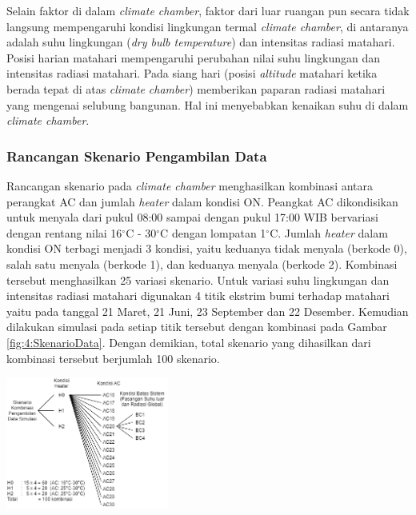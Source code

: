 \documentclass[a4paper,10pt]{article}
\makeatletter
\newenvironment{body}{\begin{multicols}{2}}{\end{multicols}}
\renewenvironment{figure}
{\def\@captype{figure}%
	\captionsetup{labelsep=period,format=hang,font=footnotesize,justification=justified}
}
{}
\makeatother
\begin{document}
\begin{body}
		Selain faktor di dalam \textit{climate chamber}, faktor dari luar ruangan pun secara tidak langsung mempengaruhi kondisi lingkungan termal \textit{climate chamber}, di antaranya adalah suhu lingkungan (\textit{dry bulb temperature}) dan intensitas radiasi matahari. Posisi harian matahari mempengaruhi perubahan nilai suhu lingkungan dan intensitas radiasi matahari. Pada siang hari (posisi \textit{altitude} matahari ketika berada tepat di atas \textit{climate chamber}) memberikan paparan radiasi matahari yang mengenai selubung bangunan. Hal ini menyebabkan kenaikan suhu di dalam \textit{climate chamber}.\\
		
		\subsubsection{Rancangan Skenario Pengambilan Data}
		Rancangan skenario pada \textit{climate chamber} menghasilkan kombinasi antara perangkat AC dan jumlah \textit{heater} dalam kondisi ON. Peangkat AC dikondisikan untuk menyala dari pukul 08:00 sampai dengan pukul 17:00 WIB bervariasi dengan rentang nilai 16$^\circ$C - 30$^\circ$C dengan lompatan 1$^\circ$C. Jumlah \textit{heater} dalam kondisi ON terbagi menjadi 3 kondisi, yaitu keduanya tidak menyala (berkode 0), salah satu menyala (berkode 1), dan keduanya menyala (berkode 2). Kombinasi tersebut menghasilkan 25 variasi skenario. Untuk variasi suhu lingkungan dan intensitas radiasi matahari digunakan 4 titik ekstrim bumi terhadap matahari yaitu pada tanggal 21 Maret, 21 Juni, 23 September dan 22 Desember. Kemudian dilakukan simulasi pada setiap titik tersebut dengan kombinasi pada Gambar \ref{fig:4:SkenarioData}. Dengan demikian, total skenario yang dihasilkan dari kombinasi tersebut berjumlah 100 skenario.\\
		
		\begin{figure}
			\centering
			\includegraphics[width=0.4\textwidth]{figures/SkenarioData}
			\caption{Skenario Pengambilan Data}
			\label{fig:4:SkenarioData}
		\end{figure}
		\vspace{2mm}
		

\end{body}
\end{document}
